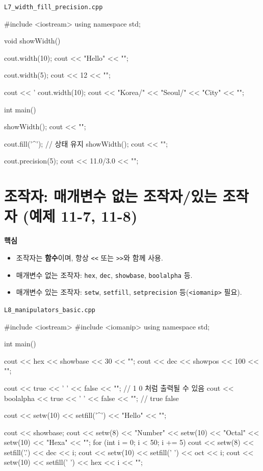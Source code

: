 \documentclass[11pt,a4paper]{article}
\newcommand{\filetag}[1]{\texttt{\color{Accent}#1}}
\begin{document}
\noindent\filetag{L7\_width\_fill\_precision.cpp}
\begin{cppcode}
#include <iostream>
using namespace std;

void showWidth() {
    cout.width(10);
    cout << "Hello" << "\n";

    cout.width(5);
    cout << 12 << "\n";

    cout << '%
    cout.width(10);
    cout << "Korea/" << "Seoul/" << "City" << "\n";
}

int main() {
    showWidth();
    cout << "\n";

    cout.fill('^');   // 상태 유지
    showWidth();
    cout << "\n";

    cout.precision(5);
    cout << 11.0/3.0 << "\n";
}
\end{cppcode}

\section{조작자: 매개변수 없는 조작자/있는 조작자 (예제 11-7, 11-8)}
\begin{GoalBox}
\textbf{핵심}
\begin{itemize}[leftmargin=18pt]
  \item 조작자는 \textbf{함수}이며, 항상 \texttt{<<} 또는 \texttt{>>}와 함께 사용. %
  \item 매개변수 없는 조작자: \texttt{hex}, \texttt{dec}, \texttt{showbase}, \texttt{boolalpha} 등. %
  \item 매개변수 있는 조작자: \texttt{setw}, \texttt{setfill}, \texttt{setprecision} 등(\texttt{<iomanip>} 필요). %
\end{itemize}
\end{GoalBox}

\noindent\filetag{L8\_manipulators\_basic.cpp}
\begin{cppcode}
#include <iostream>
#include <iomanip>
using namespace std;

int main() {
    cout << hex << showbase << 30 << "\n";
    cout << dec << showpos << 100 << "\n";

    cout << true << ' ' << false << "\n";         // 1 0 처럼 출력될 수 있음
    cout << boolalpha << true << ' ' << false << "\n"; // true false

    cout << setw(10) << setfill('^') << "Hello" << "\n";

    cout << showbase;
    cout << setw(8) << "Number" << setw(10) << "Octal" << setw(10) << "Hexa" << "\n";
    for (int i = 0; i < 50; i += 5) {
        cout << setw(8) << setfill('.') << dec << i;
        cout << setw(10) << setfill(' ') << oct << i;
        cout << setw(10) << setfill(' ') << hex << i << "\n";
    }
}
\end{cppcode}
\end{document}
